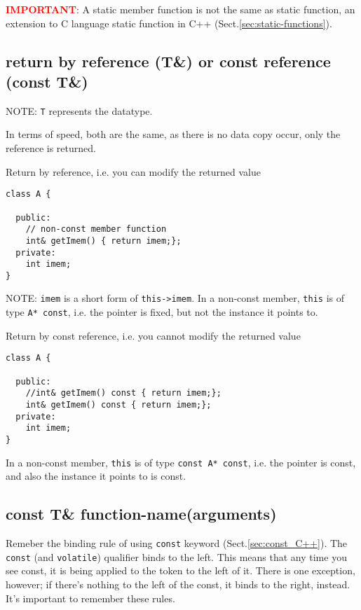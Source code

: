 \textcolor{red}{\bf IMPORTANT}: A static member function is not the same as
static function, an extension to C language static function in C++
(Sect.\ref{sec:static-functions}).



\subsection{return by reference (T\&) or const reference (const T\&)}
\label{sec:return-by-reference}

NOTE: \verb!T! represents the datatype.

In terms of speed, both are the same, as there is no data copy occur, only the
reference is returned.

Return by reference, i.e. you can modify the returned value
\begin{lstlisting}
class A {

  public:
    // non-const member function
    int& getImem() { return imem;};
  private:
    int imem;
}
\end{lstlisting}
NOTE: \verb!imem! is a short form of \verb!this->imem!. 
In a non-const member,  \verb!this! is of type \verb!A* const!, i.e. the pointer
is fixed, but not the instance it points to.

Return by const reference, i.e. you cannot modify the returned value
\begin{lstlisting}
class A {

  public:
    //int& getImem() const { return imem;};
    int& getImem() const { return imem;};
  private:
    int imem;
}
\end{lstlisting}
In a non-const member,  \verb!this! is of type \verb!const A* const!, i.e. the
pointer is const, and also the instance it points to is const.




\subsection{const T\& function-name(arguments)}

Remeber the binding rule of using \verb!const! keyword
(Sect.\ref{sec:const_C++}). The \verb!const! (and \verb!volatile!) qualifier
binds to the left. This means that any time you see const, it is being applied
to the token to the left of it.
There is one exception, however; if there's nothing to the left of the const, it
binds to the right, instead. It's important to remember these rules.

